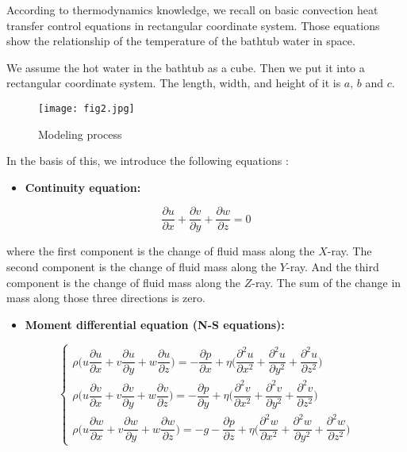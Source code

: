 \documentclass{mcmthesis}
\begin{document}
According to thermodynamics knowledge, we recall on basic convection
heat transfer control equations in rectangular coordinate system. Those
equations show the relationship of the temperature of the bathtub water in space.

We assume the hot water in the bathtub as a cube. Then we put it into a
rectangular coordinate system. The length, width, and height of it is $a,\, b$ and $c$.

\begin{figure}[h] 
\centering
\texttt{[image: fig2.jpg]}
\caption{Modeling process} \label{fig2}
\end{figure}

In the basis of this, we introduce the following equations \cite{5}:

\begin{itemize}
\item {\bf Continuity equation:}
\end{itemize}

\begin{equation} \label{eq1}
\frac{\partial u}{\partial x} + \frac{\partial v}{\partial y} +\frac{\partial w}{\partial z} =0
\end{equation}

\noindent where the first component is the change of fluid mass along the $X$-ray. The second component is the change of fluid mass along the $Y$-ray. And the third component is the change of fluid mass along the $Z$-ray. The sum of the change in mass along those three directions is zero.

\begin{itemize}
\item {\bf Moment differential equation (N-S equations):}
\end{itemize}

\begin{equation} \label{eq2}
\left\{
\begin{array}{l} \!\!
\rho \Big(u \dfrac{\partial u}{\partial x} + v \dfrac{\partial u}{\partial y} + w\dfrac{\partial u}{\partial z} \Big) = -\dfrac{\partial p}{\partial x} + \eta \Big(\dfrac{\partial^2 u}{\partial x^2} + \dfrac{\partial^2 u}{\partial y^2} + \dfrac{\partial^2 u}{\partial z^2} \Big) \\[0.3cm]
\rho \Big(u \dfrac{\partial v}{\partial x} + v \dfrac{\partial v}{\partial y} + w\dfrac{\partial v}{\partial z} \Big) = -\dfrac{\partial p}{\partial y} + \eta \Big(\dfrac{\partial^2 v}{\partial x^2} + \dfrac{\partial^2 v}{\partial y^2} + \dfrac{\partial^2 v}{\partial z^2} \Big) \\[0.3cm]
\rho \Big(u \dfrac{\partial w}{\partial x} + v \dfrac{\partial w}{\partial y} + w\dfrac{\partial w}{\partial z} \Big) = -g-\dfrac{\partial p}{\partial z} + \eta \Big(\dfrac{\partial^2 w}{\partial x^2} + \dfrac{\partial^2 w}{\partial y^2} + \dfrac{\partial^2 w}{\partial z^2} \Big)  
\end{array}
\right.
\end{equation}
\end{document}
